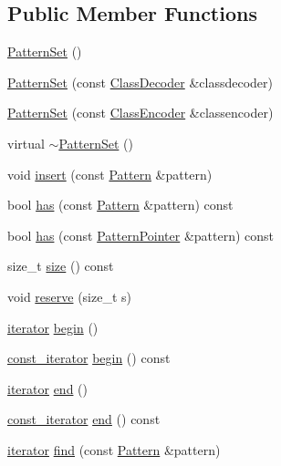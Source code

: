 \subsection*{Public Member Functions}
\begin{DoxyCompactItemize}
\item 
\hyperlink{classPatternSet_a8cf2b4c7f096c7a3a7d17342c0153154}{Pattern\+Set} ()
\item 
\hyperlink{classPatternSet_a0174aa499a90c0a191fb3ad9d003c343}{Pattern\+Set} (const \hyperlink{classClassDecoder}{Class\+Decoder} \&classdecoder)
\item 
\hyperlink{classPatternSet_a693cd64ce7f5ab7f0e9c2dc15d8179fe}{Pattern\+Set} (const \hyperlink{classClassEncoder}{Class\+Encoder} \&classencoder)
\item 
virtual \hyperlink{classPatternSet_a4a521fd6ed29c03dad6e665cfe840a01}{$\sim$\+Pattern\+Set} ()
\item 
void \hyperlink{classPatternSet_aee78dae3e67875f22089ba537d50bc29}{insert} (const \hyperlink{classPattern}{Pattern} \&pattern)
\item 
bool \hyperlink{classPatternSet_a25e9ec9ca33750f21dd729cd2462d925}{has} (const \hyperlink{classPattern}{Pattern} \&pattern) const 
\item 
bool \hyperlink{classPatternSet_a28de1eeb8ec5774505173cc28e06320e}{has} (const \hyperlink{classPatternPointer}{Pattern\+Pointer} \&pattern) const 
\item 
size\+\_\+t \hyperlink{classPatternSet_af85860d7135a5154a01a8366131beb39}{size} () const 
\item 
void \hyperlink{classPatternSet_ac66abd4ac79ee7d35548a3bbfd8e5e8f}{reserve} (size\+\_\+t s)
\item 
\hyperlink{classPatternSet_a18b78ea966c57db2373741291ba610f3}{iterator} \hyperlink{classPatternSet_ac8c206e63c54d45443a38df762cea863}{begin} ()
\item 
\hyperlink{classPatternSet_a5d419991ea0abb0fbc4a2282574b1b8c}{const\+\_\+iterator} \hyperlink{classPatternSet_af78486457770e3260e73fc233b789a1a}{begin} () const 
\item 
\hyperlink{classPatternSet_a18b78ea966c57db2373741291ba610f3}{iterator} \hyperlink{classPatternSet_a8ef5ec893a3ab9b00cf70cfdf2e623b9}{end} ()
\item 
\hyperlink{classPatternSet_a5d419991ea0abb0fbc4a2282574b1b8c}{const\+\_\+iterator} \hyperlink{classPatternSet_af0b085d67c1aa4c38aa40451868a8500}{end} () const 
\item 
\hyperlink{classPatternSet_a18b78ea966c57db2373741291ba610f3}{iterator} \hyperlink{classPatternSet_a2c56aa5b266f2132f8453bf794bba1f5}{find} (const \hyperlink{classPattern}{Pattern} \&pattern)

\end{DoxyCompactItemize}
